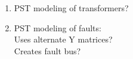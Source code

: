 \documentclass[12pt]{article}
\begin{document}
\begin{multicols}{2}
\begin{enumerate}
		\item PST modeling of transformers?
		\item PST modeling of faults: \\
		Uses alternate Y matrices? \\
		Creates fault bus?
	\end{enumerate}



\vfill\null
\end{multicols}



\begin{comment}
\paragraph{Future Tasks:} %
	\begin{enumerate}
		\item none		
	\end{enumerate}
	
\paragraph{Future Work: (not by me)}
	\begin{itemize}
		\item none
	\end{itemize}

\paragraph{Requests:}
	\begin{enumerate}
			\item none
	\end{enumerate}
\end{comment}
\end{document}
